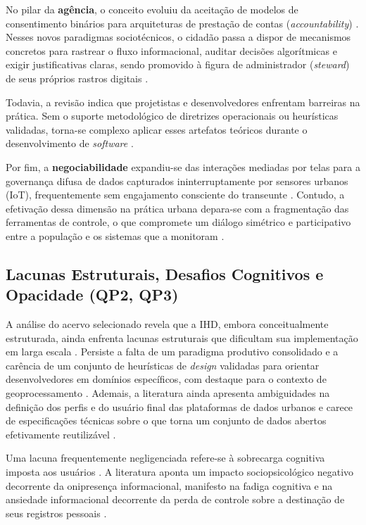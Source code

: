\documentclass[12pt]{article}
\begin{document}
    No pilar da \textbf{agência}, o conceito evoluiu da aceitação de modelos de consentimento binários para arquiteturas de prestação de contas (\textit{accountability}) \cite{janecek2018ownership}. Nesses novos paradigmas sociotécnicos, o cidadão passa a dispor de mecanismos concretos para rastrear o fluxo informacional, auditar decisões algorítmicas e exigir justificativas claras, sendo promovido à figura de administrador (\textit{steward}) de seus próprios rastros digitais \cite{angelopoulos2021stewardship}. 

    Todavia, a revisão indica que projetistas e desenvolvedores enfrentam barreiras na prática. Sem o suporte metodológico de diretrizes operacionais ou heurísticas validadas, torna-se complexo aplicar esses artefatos teóricos durante o desenvolvimento de \textit{software} \cite{Strey2019Human, Victorelli2020Human, chalhoub2024useful}. 

    Por fim, a \textbf{negociabilidade} expandiu-se das interações mediadas por telas para a governança difusa de dados capturados ininterruptamente por sensores urbanos (IoT), frequentemente sem engajamento consciente do transeunte \cite{Locoro2020}. Contudo, a efetivação dessa dimensão na prática urbana depara-se com a fragmentação das ferramentas de controle, o que compromete um diálogo simétrico e participativo entre a população e os sistemas que a monitoram \cite{Chatzimichali2021160}.
        
    \subsection{Lacunas Estruturais, Desafios Cognitivos e Opacidade (QP2, QP3)}

    A análise do acervo selecionado revela que a IHD, embora conceitualmente estruturada, ainda enfrenta lacunas estruturais que dificultam sua implementação em larga escala \cite{Sailaja2021Designing, Strey2019Human}. Persiste a falta de um paradigma produtivo consolidado e a carência de um conjunto de heurísticas de \textit{design} validadas para orientar desenvolvedores em domínios específicos, com destaque para o contexto de geoprocessamento \cite{Capeleti2024Human}. Ademais, a literatura ainda apresenta ambiguidades na definição dos perfis e do usuário final das plataformas de dados urbanos \cite{Belizario2023Interacao} e carece de especificações técnicas sobre o que torna um conjunto de dados abertos efetivamente reutilizável \cite{Koesten2020}.

    Uma lacuna frequentemente negligenciada refere-se à sobrecarga cognitiva imposta aos usuários \cite{Locoro2020}. A literatura aponta um impacto sociopsicológico negativo decorrente da onipresença informacional, manifesto na fadiga cognitiva e na ansiedade informacional decorrente da perda de controle sobre a destinação de seus registros pessoais \cite{cezar2023cognitive}.
\end{document}
